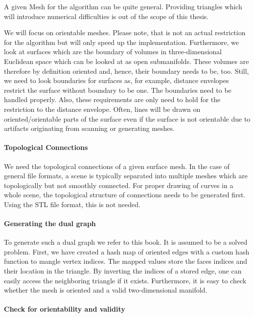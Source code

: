 \documentclass{stdlocal}
\begin{document}
  A given Mesh for the algorithm can be quite general.
  Providing triangles which will introduce numerical difficulties is out of the scope of this thesis.

  We will focus on orientable meshes.
  Please note, that is not an actual restriction for the algorithm but will only speed up the implementation.
  Furthermore, we look at surfaces which are the boundary of volumes in three-dimensional Euclidean space which can be looked at as open submanifolds.
  These volumes are therefore by definition oriented and, hence, their boundary needs to be, too.
  Still, we need to look boundaries for surfaces as, for example, distance envelopes restrict the surface without boundary to be one.
  The boundaries need to be handled properly.
  Also, these requirements are only need to hold for the restriction to the distance envelope.
  Often, lines will be drawn on oriented/orientable parts of the surface even if the surface is not orientable due to artifacts originating from scanning or generating meshes.

  \paragraph{Topological Connections}
  We need the topological connections of a given surface mesh.
  In the case of general file formats, a scene is typically separated into multiple meshes which are topologically but not smoothly connected.
  For proper drawing of curves in a whole scene, the topological structure of connections needs to be generated first.
  Using the STL file format, this is not needed.

  \paragraph{Generating the dual graph}
   To generate such a dual graph we refer to this book.
  It is assumed to be a solved problem.
  First, we have created a hash map of oriented edges with a custom hash function to mangle vertex indices.
  The mapped values store the faces indices and their location in the triangle.
  By inverting the indices of a stored edge, one can easily access the neighboring triangle if it exists.
  Furthermore, it is easy to check whether the mesh is oriented and a valid two-dimensional manifold.

  \paragraph{Check for orientability and validity}
\end{document}
